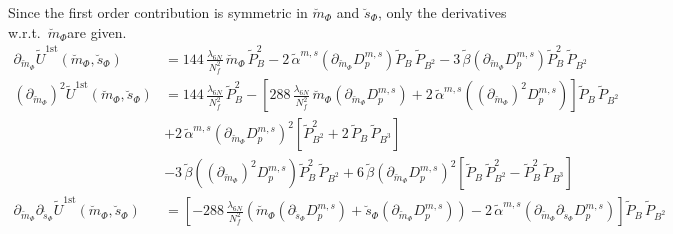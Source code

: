 Since the first order contribution is symmetric in $\breve m_{\Phi}$ and $\breve s_{\Phi}$, only the derivatives w.r.t.\ $\breve m_{\Phi}$are given. 
\begin{align}\label{eq:CEP_derivative_dm_firstOrder_rescaled}
 \partial_{\breve m_{\Phi}} \tilde U^{\text{1st}}(\breve m_{\Phi}, \breve s_{\Phi}) & = 
                           144\,\frac{\lambda_{6N}}{N_f^2}\, \breve m_{\Phi}\, \tilde P_B^2 
                         - 2\,\tilde \alpha^{m,s}\left( \partial_{\breve m_{\Phi}} D_p^{m,s} \right) \tilde P_B\, \tilde P_{B^2}
                         - 3\, \tilde \beta \left( \partial_{\breve m_{\Phi}} D_p^{m,s} \right) \tilde P_B^2\,  \tilde P_{B^2}
%                          
       \\ \label{eq:CEP_derivative_dmdm_firstOrder_rescaled}
 \left(\partial_{\breve m_{\Phi}}\right)^2 \tilde U^{\text{1st}}(\breve m_{\Phi}, \breve s_{\Phi}) & = 
                           144\,\frac{\lambda_{6N}}{N_f^2}\, \tilde P_B^2 -
                           \left[ 288\,\frac{\lambda_{6N}}{N_f^2}\,\breve m_{\Phi}\left( \partial_{\breve m_{\Phi}} D_p^{m,s} \right) 
                         + 2\,\tilde \alpha^{m,s}\left( \left(\partial_{\breve m_{\Phi}}\right)^2 D_p^{m,s} \right) \right] \tilde P_B\, \tilde P_{B^2}
       \nonumber \\
                       & + 2\,\tilde \alpha^{m,s}\left( \partial_{\breve m_{\Phi}} D_p^{m,s} \right)^2 \left[ \tilde P_{B^2}^2 + 2\, \tilde P_B\, \tilde P_{B^3} \right]
       \nonumber \\
                       & - 3\, \tilde \beta \left( \left(\partial_{\breve m_{\Phi}}\right)^2 D_p^{m,s} \right) \tilde P_B^2\,  \tilde P_{B^2}
                         + 6\, \tilde \beta \left( \partial_{\breve m_{\Phi}} D_p^{m,s} \right)^2 
                         \left[ \tilde P_B\,  \tilde P_{B^2}^2 - \tilde P_B^2\,  \tilde P_{B^3} \right]
%                          
      \\ \label{eq:CEP_derivative_dmds_firstOrder_rescaled}
 \partial_{\breve m_{\Phi}}\partial_{\breve s_{\Phi}}\tilde U^{\text{1st}}(\breve m_{\Phi}, \breve s_{\Phi}) & =
                         \left[- 288\,\frac{\lambda_{6N}}{N_f^2}\left( \breve m_{\Phi} \left( \partial_{\breve s_{\Phi}} D_p^{m,s} \right) + \breve s_{\Phi} \left( \partial_{\breve m_{\Phi}} D_p^{m,s} \right) \right)
                         - 2\,\tilde \alpha^{m,s} \left( \partial_{\breve m_{\Phi}} \partial_{\breve s_{\Phi}} D_p^{m,s} \right) \right] \tilde P_B\, \tilde P_{B^2}
      \nonumber \\

\end{align}
